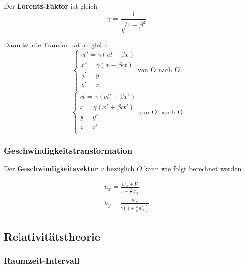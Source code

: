 \documentclass[7pt]{article}
\begin{document}
\begin{multicols*}{3}
Der \textbf{Lorentz-Faktor} ist gleich
\begin{equation*}
	\gamma = \frac{1}{\sqrt{1-\beta^2}}
\end{equation*}

Dann ist die Transformation gleich
\begin{equation*}
		\left\{
		\begin{array}{ll}
			ct' = \gamma(ct - \beta x) \\
        	x' = \gamma(x - \beta ct) \\
            y' = y \\
            z' = z \\
		\end{array}
	\right.
	\text{von O nach O'}
\end{equation*}
\begin{equation*}
		\left\{
		\begin{array}{ll}
			ct = \gamma(ct' + \beta x') \\
        	x = \gamma(x' + \beta ct') \\
            y = y' \\
            z = z' \\
		\end{array}
	\right.
	\text{von O' nach O}
\end{equation*}

\subsubsection{Geschwindigkeitstransformation}

Der \textbf{Geschwindigkeitsvektor $u$} bez{\"u}glich $O$ kann wie folgt berechnet werden

\begin{equation*}
	\begin{array}{ll}
		u_x = \frac{u'_x + V}{1 + \frac{\beta}{c}u'_x} \\
		u_y = \frac{u'_y}{\gamma(1+\frac{\beta}{c}u'_x)}
	\end{array}
\end{equation*}

\subsection{Relativit{\"a}tstheorie}

\subsubsection{Raumzeit-Intervall}


\end{multicols*}
\end{document}
